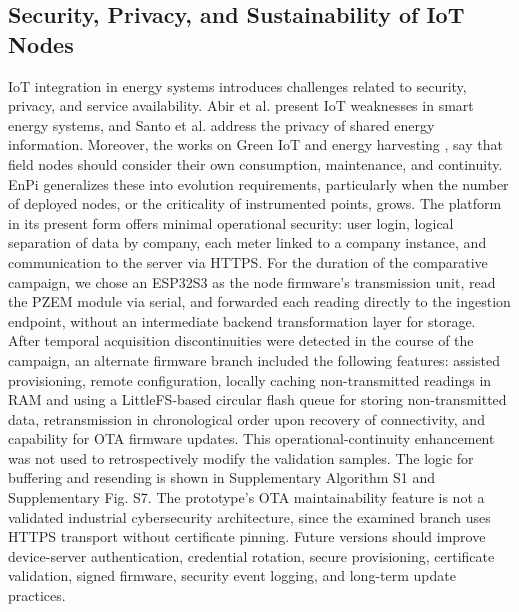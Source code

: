 \documentclass[technologies,article,submit,pdftex,moreauthors]{Definitions/mdpi}
\begin{document}
\subsection{Security, Privacy, and Sustainability of IoT Nodes}
\label{subsec:security-privacy}
IoT integration in energy systems introduces challenges related to security, privacy, and service availability. Abir et al. \cite{ref6} present IoT weaknesses in smart energy systems, and Santo et al. \cite{ref7} address the privacy of shared energy information. Moreover, the works on Green IoT and energy harvesting \cite{ref8}, \cite{ref9} say that field nodes should consider their own consumption, maintenance, and continuity. EnPi generalizes these into evolution requirements, particularly when the number of deployed nodes, or the criticality of instrumented points, grows.
The platform in its present form offers minimal operational security: user login, logical separation of data by company, each meter linked to a company instance, and communication to the server via HTTPS. For the duration of the comparative campaign, we chose an ESP32S3 as the node firmware's transmission unit, read the PZEM module via serial, and forwarded each reading directly to the ingestion endpoint, without an intermediate backend transformation layer for storage. After temporal acquisition discontinuities were detected in the course of the campaign, an alternate firmware branch included the following features: assisted provisioning, remote configuration, locally caching non-transmitted readings in RAM and using a LittleFS-based circular flash queue for storing non-transmitted data, retransmission in chronological order upon recovery of connectivity, and capability for OTA firmware updates. This operational-continuity enhancement was not used to retrospectively modify the validation samples. The logic for buffering and resending is shown in Supplementary Algorithm S1 and Supplementary Fig. S7. The prototype's OTA maintainability feature is not a validated industrial cybersecurity architecture, since the examined branch uses HTTPS transport without certificate pinning. Future versions should improve device-server authentication, credential rotation, secure provisioning, certificate validation, signed firmware, security event logging, and long-term update practices. 
\end{document}
